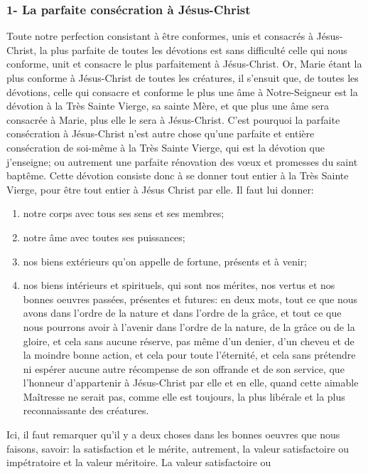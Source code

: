 \subsubsection{1- La parfaite consécration à Jésus-Christ}
 Toute notre perfection consistant à être conformes, unis et consacrés à Jésus-Christ, la plus parfaite de
toutes les dévotions est sans difficulté celle qui nous conforme, unit et consacre le plus parfaitement à Jésus-Christ. Or, Marie étant la plus conforme à Jésus-Christ de toutes les créatures, il s'ensuit que, de toutes les dévotions,
celle qui consacre et conforme le plus une âme à Notre-Seigneur est la dévotion à la Très Sainte Vierge, sa sainte
Mère, et que plus une âme sera consacrée à Marie, plus elle le sera à Jésus-Christ.
C'est pourquoi la parfaite consécration à Jésus-Christ n'est autre chose qu'une parfaite et entière consécration de
soi-même à la Très Sainte Vierge, qui est la dévotion que j'enseigne; ou autrement une parfaite rénovation des
vœux et promesses du saint baptême.
 Cette dévotion consiste donc à se donner tout entier à la Très Sainte Vierge, pour être tout entier à Jésus Christ par elle. Il faut lui donner:
\begin{enumerate}[label=\arabic*°]
  \item notre corps avec tous ses sens et ses membres;
  \item notre âme avec toutes ses puissances;
  \item nos biens extérieurs qu'on appelle de fortune, présents et à venir;
  \item nos biens intérieurs et spirituels, qui sont nos mérites, nos vertus et nos bonnes oeuvres passées, présentes et futures: en deux mots, tout ce que nous avons dans l'ordre de la nature et dans l'ordre de la grâce, et tout ce que nous pourrons avoir à
l'avenir dans l'ordre de la nature, de la grâce ou de la gloire, et cela sans aucune réserve, pas même d'un denier,
d'un cheveu et de la moindre bonne action, et cela pour toute l'éternité, et cela sans prétendre ni espérer aucune
autre récompense de son offrande et de son service, que l'honneur d'appartenir à Jésus-Christ par elle et en elle,
quand cette aimable Maîtresse ne serait pas, comme elle est toujours, la plus libérale et la plus reconnaissante
 des créatures.
\end{enumerate}
 Ici, il faut remarquer qu'il y a deux choses dans les bonnes oeuvres que nous faisons, savoir: la satisfaction
et le mérite, autrement, la valeur satisfactoire ou impétratoire et la valeur méritoire. La valeur satisfactoire ou
